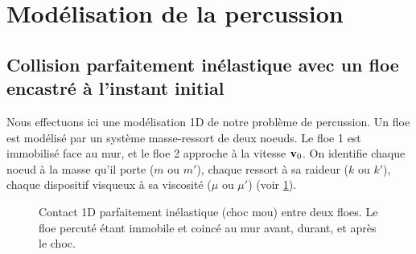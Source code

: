 


\section{Modélisation de la percussion}









\subsection{Collision parfaitement inélastique avec un floe encastré à l'instant initial}



Nous effectuons ici une modélisation 1D de notre problème de percussion. Un floe est modélisé par un système masse-ressort de deux noeuds. Le floe 1 est immobilisé face au mur, et le floe 2 approche à la vitesse $\bm{\mathrm{v}}_0$. On identifie chaque noeud à la masse qu'il porte ($m$ ou $m'$), chaque ressort à sa raideur ($k$ ou $k'$), chaque dispositif visqueux à sa viscosité ($\mu$ ou $\mu'$) (voir \cref{fig:contact1d}).
\begin{figure}[!h]
    \centering
    \caption{Contact 1D parfaitement inélastique (choc mou) entre deux floes. Le floe percuté étant immobile et coincé au mur avant, durant, et après le choc.}
    \label{fig:contact1d}
\end{figure}

